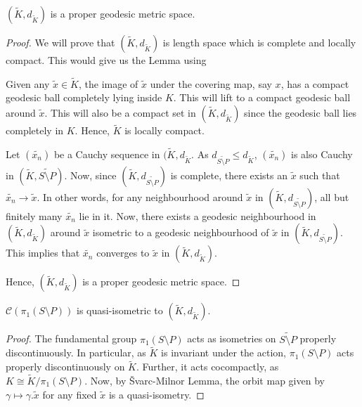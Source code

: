 \begin{lem}
	$\left(\tilde{K}, d_{\tilde{K}}\right)$ is a proper geodesic metric space.
\end{lem}
\begin{proof}
	We will prove that $\left(\tilde{K}, d_{\tilde{K}}\right)$ is length space which is complete and locally compact. This would give us the Lemma using \cite[Proposition 3.7]{BH}
	
	Given any $\tilde{x} \in \tilde{K}$, the image of $\tilde{x}$ under the covering map, say $x$, has a compact geodesic ball completely lying inside $K$. This will lift to a compact geodesic ball around $\tilde{x}$. This will also be a compact set in $(\tilde{K}, d_{\tilde{K}})$ since the geodesic ball lies completely in $K$. Hence, $\tilde{K}$ is locally compact.
	
	Let $(\tilde{x_n})$ be a Cauchy sequence in $(\tilde{K},d_{\tilde{K}}$. As $d_{\widetilde{S \setminus P}} \leq d_{\tilde{K}}$, $(\tilde{x_n})$ is also Cauchy in $(\tilde{K},\tilde{S \setminus P})$. Now, since $(\tilde{K},d_{\widetilde{S \setminus P}})$ is complete, there exists an $\tilde{x}$ such that $\tilde{x_n} \rightarrow \tilde{x}$. In other words, for any neighbourhood around $\tilde{x}$ in $(\tilde{K}, d_{\widetilde{S \setminus P}})$, all but finitely many $\tilde{x_n}$ lie in it. Now, there exists a geodesic neighbourhood in $(\tilde{K},d_{\tilde{K}})$ around $\tilde{x}$ isometric to a geodesic neighbourhood of $\tilde{x}$ in $(\tilde{K},d_{\widetilde{S \setminus P}})$. This implies that $\tilde{x_n}$ converges to $\tilde{x}$ in $(\tilde{K},d_{\tilde{K}})$.
	
	Hence, $(\tilde{K},d_{\tilde{K}})$ is a proper geodesic metric space.
	
	
\end{proof}
\begin{lem}
	$\mathcal{C}(\pi_1(S \setminus P))$ is quasi-isometric to $(\widetilde{K},d_{\tilde{K}})$.
\end{lem}

\begin{proof}
	The fundamental group $\pi_1(S \setminus P)$ acts as isometries on $\widetilde{S \setminus P}$ properly discontinuously. In particular, as $\tilde{K}$ is invariant under the action, $\pi_1(S \setminus P)$ acts properly discontinuously on $\tilde{K}$. Further, it acts cocompactly, as $K \cong \tilde{K}/\pi_1(S \setminus P)$. Now, by \v{S}varc-Milnor Lemma, the orbit map given by $\gamma \mapsto \gamma.\tilde{x}$ for any fixed $\tilde{x}$ is a quasi-isometry. 
\end{proof}

